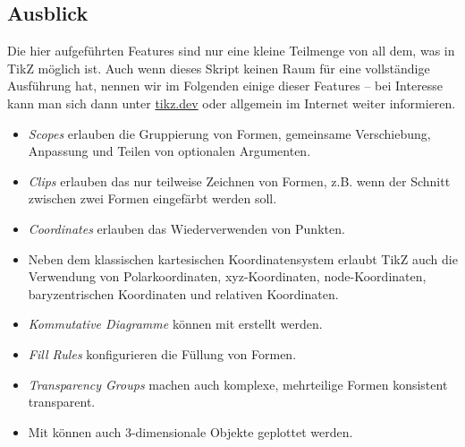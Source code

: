 \subsection{Ausblick}
Die hier aufgeführten Features sind nur eine kleine Teilmenge von all dem, was in TikZ möglich ist.
Auch wenn dieses Skript keinen Raum für eine vollständige Ausführung hat, nennen wir im Folgenden einige dieser Features -- bei Interesse kann man sich dann unter \url{tikz.dev} oder allgemein im Internet weiter informieren.
\begin{itemize}
	\item \emph{Scopes} erlauben die Gruppierung von Formen, gemeinsame Verschiebung, Anpassung und Teilen von optionalen Argumenten.
	\item \emph{Clips} erlauben das nur teilweise Zeichnen von Formen, z.B. wenn der Schnitt zwischen zwei Formen eingefärbt werden soll.
	\item \emph{Coordinates} erlauben das Wiederverwenden von Punkten.
	\item Neben dem klassischen kartesischen Koordinatensystem erlaubt TikZ auch die Verwendung von Polarkoordinaten, xyz-Koordinaten, node-Koordinaten, baryzentrischen Koordinaten und relativen Koordinaten.
	\item \emph{Kommutative Diagramme} können mit  erstellt werden.
	\item \emph{Fill Rules} konfigurieren die Füllung von Formen.
	\item \emph{Transparency Groups} machen auch komplexe, mehrteilige Formen konsistent transparent.
	\item Mit  können auch 3-dimensionale Objekte geplottet werden.
\end{itemize}
